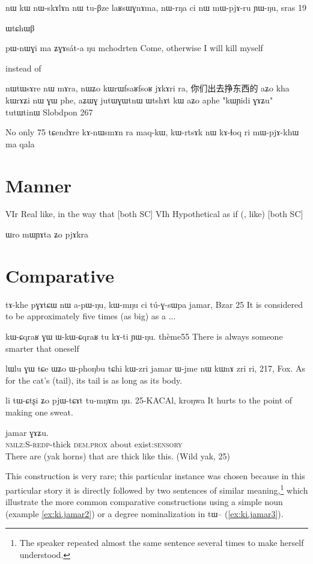 \documentclass[oldfontcommands,oneside,a4paper,11pt]{memoir}
\newcommand{\ipa}[1]{{\phon #1}} %
\newcommand{\wav}[1]{}%
\begin{document}
nɯ kɯ nɯ-skɤlɤn nɯ tu-βze laʁsɯɣnɤma, nɯ-rŋa ci nɯ mɯ-pjɤ-ru ɲɯ-ŋu,
sras 19



ɯtɕhɯβ



pɯ-nɯɣi	ma	ʑɣɤsát-a	ŋu
mchodrten
Come, otherwise I will kill myself


instead of

nɯtɯsɤre nɯ mɤra, nɯʑo kɯrɯfsaʁfsoʁ jɤkɤri ra, 你们出去挣东西的
aʑo kha kɯrɤʑi nɯ ɣɯ phe, aʑɯɣ jutɯɣɯtnɯ ɯtshɤt kɯ aʑo aphe "kɯɲidi ɣɤʑu" tutɯtinɯ
Slobdpon 267



No only
75	tɕendɤre	kɤ-nɯsmɤn	ra	maq-kɯ,	kɯ-rtsɤk	nɯ	kɤ-ɬoq	ri	mɯ-pjɤ-khɯ	ma
qala


\section{Manner}
VIr Real like, in the way that [both SC]
VIh Hypothetical as if (, like) [both SC]


ɯro mɯɲɤta ʑo pjɤkra

\section{Comparative}
tɤ-khe	pɣɤtɕɯ	nɯ	a-pɯ-ŋu,	kɯ-mŋu	ci	tú-ɣ-sɯpa	jamar,
Bzar 25 It is considered to be approximately five times (as big) as a ...

 
kɯ-ɕqraʁ ɣɯ ɯ-kɯ-ɕqraʁ tu kɤ-ti ɲɯ-ŋu.
thème55
There is always someone smarter that oneself


lɯlu ɣɯ tɕe ɯʑo ɯ-phoŋbu tɕhi kɯ-zri jamar ɯ-jme nɯ kɯnɤ zri ri,
217, \wav{x-27-qartshaz} Fox.
As for the cat's (tail), its tail is as long as its body.


li tɯ-ɕtʂi ʑo pjɯ-tɕɤt tu-mŋɤm ŋu. 
25-KACAl, kroŋwa
It hurts to the point of making one sweat.



\begin{exe}
   \ex  \label{ex:ki.jamar1}
   \gll
[\ipa{kɯ-jpɯ-jpum}]   	\ipa{ki}   	\ipa{jamar}   	\ipa{ɣɤʑu.}   \\
   \textsc{nmlz:S-redp}-thick \textsc{dem.prox} about exist:\textsc{sensory} \\
\glt There are (yak horns) that are thick like this. (Wild yak, 25)
\end{exe}

This construction is very rare; this particular instance was chosen because in this particular story it is directly followed by two sentences of similar meaning,\footnote{The speaker repeated almost the same sentence several times to make herself understood.} which illustrate the more common comparative constructions using a simple noun (example \ref{ex:ki.jamar2}) or a degree nominalization in \ipa{tɯ}-- (\ref{ex:ki.jamar3}).
\end{document}
